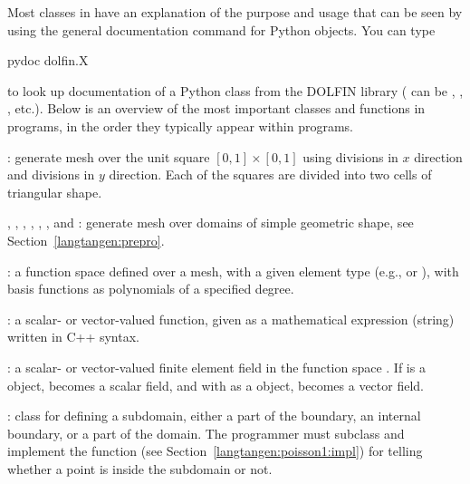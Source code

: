 Most classes in \fenics{} have an explanation of the purpose and usage
that can be seen by using the general documentation command 
for Python objects. You can type
\begin{progoutput}
pydoc dolfin.X
\end{progoutput}
%
to look up documentation of a Python class  from the DOLFIN
library ( can be , , ,
etc.). Below is an overview of the most important classes and functions
in \fenics{} programs, in the order they typically appear within
programs.
%
\begin{trivlist}
  \item[\emp{UnitSquare(nx, ny)}:] generate mesh over the unit square
  $[0,1]\times [0,1]$ using  divisions in $x$ direction and
   divisions in $y$ direction. Each of the  squares
  are divided into two cells of triangular shape.

  \item[\emp{UnitInterval}, \emp{UnitCube}, \emp{UnitCircle},
  \emp{UnitSphere}, \emp{Interval}, \emp{Rectangle}, and \emp{Box}:]
  generate mesh over domains of simple geometric shape, see
  Section~\ref{langtangen:prepro}.

  \item[\emp{FunctionSpace(mesh, element\_type, degree)}:] a
  function space defined over a mesh, with a given element type (e.g.,
   or ), with basis functions as polynomials
  of a specified degree.

  \item[\emp{Expression(formula)}:] a scalar- or vector-valued function,
  given as a mathematical expression  (string) written in
  C++ syntax.

  \item[\emp{Function(V)}:] a scalar- or vector-valued finite element
  field in the function space . If  is a 
  object,  becomes a scalar field, and with 
  as a  object,  becomes a
  vector field.

  \item[\emp{SubDomain}:] class for defining a subdomain, either
  a part of the boundary, an internal boundary, or a part of
  the domain.  The programmer must subclass  and
  implement the  function (see
  Section~\ref{langtangen:poisson1:impl}) for telling whether a point
   is inside the subdomain or not.


\end{trivlist}
